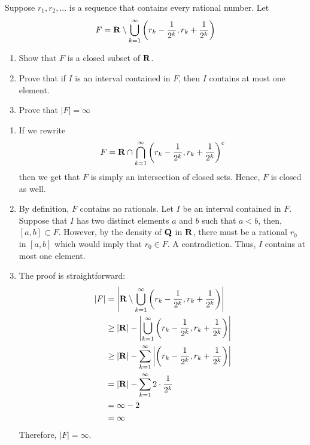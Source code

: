 \begin{exercise}
    Suppose $r_1, r_2, ...$ is a sequence that contains every rational number. Let 
    $$F = \mathbf{R} \setminus \bigcup_{k=1}^{\infty}\left(r_k - \frac{1}{2^k}, r_k + \frac{1}{2^k}\right)$$
    \begin{enumerate}[label = (\alph*)]
        \item Show that $F$ is a closed subset of $\mathbf{R}$.
        \item Prove that if $I$ is an interval contained in $F$, then $I$ contains at most one element.
        \item Prove that $|F| = \infty$\\
    \end{enumerate}
\end{exercise}

\begin{solution}
    \begin{enumerate}[label = (\alph*)]
        \item If we rewrite
        $$F = \mathbf{R} \cap \bigcap_{k=1}^{\infty}\left(r_k - \frac{1}{2^k}, r_k + \frac{1}{2^k}\right)^c$$
        then we get that $F$ is simply an intersection of closed sets. Hence, $F$ is closed as well.
        \item By definition, $F$ contains no rationals. Let $I$ be an interval contained in $F$. Suppose that $I$ has two distinct elements $a$ and $b$ such that $a < b$, then, $[a,b] \subset F$. However, by the density of $\mathbf{Q}$ in $\mathbf{R}$, there must be a rational $r_0$ in $[a,b]$ which would imply that $r_0 \in F$. A contradiction. Thus, $I$ contains at most one element.
        \item The proof is straightforward:
        \begin{align*}
            |F| &= \left| \mathbf{R} \setminus \bigcup_{k=1}^{\infty} \left(r_k - \frac{1}{2^k}, r_k + \frac{1}{2^k}\right)\right| \\
            &\geq |\mathbf{R}| - \left|\bigcup_{k=1}^{\infty} \left(r_k - \frac{1}{2^k}, r_k + \frac{1}{2^k}\right)\right| \\
            &\geq |\mathbf{R}| - \sum_{k=1}^{\infty} \left| \left(r_k - \frac{1}{2^k}, r_k + \frac{1}{2^k}\right) \right|\\
            &= |\mathbf{R}| - \sum_{k=1}^{\infty}2\cdot\frac{1}{2^k}\\
            &= \infty - 2\\
            &= \infty
        \end{align*}
        Therefore, $|F| = \infty$. \\
    \end{enumerate}
\end{solution}

